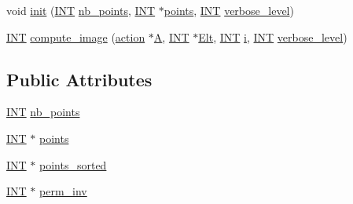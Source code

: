\begin{DoxyCompactItemize}
\item 
void \mbox{\hyperlink{classaction__by__restriction_af98e88c513afe51527082f11aac571f8}{init}} (\mbox{\hyperlink{galois_8h_a09fddde158a3a20bd2dcadb609de11dc}{I\+NT}} \mbox{\hyperlink{classaction__by__restriction_a2ac8535c2e40b78a69a6aad54deced42}{nb\+\_\+points}}, \mbox{\hyperlink{galois_8h_a09fddde158a3a20bd2dcadb609de11dc}{I\+NT}} $\ast$\mbox{\hyperlink{classaction__by__restriction_a8cfd948da85957a869756e2d0555ea7c}{points}}, \mbox{\hyperlink{galois_8h_a09fddde158a3a20bd2dcadb609de11dc}{I\+NT}} \mbox{\hyperlink{simeon_8_c_a818073fbcc2f439e7c56952f67386122}{verbose\+\_\+level}})
\item 
\mbox{\hyperlink{galois_8h_a09fddde158a3a20bd2dcadb609de11dc}{I\+NT}} \mbox{\hyperlink{classaction__by__restriction_a2d669c0f0b3905fb5effc983c9fbb0cc}{compute\+\_\+image}} (\mbox{\hyperlink{classaction}{action}} $\ast$\mbox{\hyperlink{simeon_8_c_a97833f04c3a9c008df5521a2fc291bb4}{A}}, \mbox{\hyperlink{galois_8h_a09fddde158a3a20bd2dcadb609de11dc}{I\+NT}} $\ast$\mbox{\hyperlink{simeon_8_c_aec1406935bdb1fee3561fcb840964100}{Elt}}, \mbox{\hyperlink{galois_8h_a09fddde158a3a20bd2dcadb609de11dc}{I\+NT}} \mbox{\hyperlink{alphabet2_8_c_acb559820d9ca11295b4500f179ef6392}{i}}, \mbox{\hyperlink{galois_8h_a09fddde158a3a20bd2dcadb609de11dc}{I\+NT}} \mbox{\hyperlink{simeon_8_c_a818073fbcc2f439e7c56952f67386122}{verbose\+\_\+level}})
\end{DoxyCompactItemize}
\subsection*{Public Attributes}
\begin{DoxyCompactItemize}
\item 
\mbox{\hyperlink{galois_8h_a09fddde158a3a20bd2dcadb609de11dc}{I\+NT}} \mbox{\hyperlink{classaction__by__restriction_a2ac8535c2e40b78a69a6aad54deced42}{nb\+\_\+points}}
\item 
\mbox{\hyperlink{galois_8h_a09fddde158a3a20bd2dcadb609de11dc}{I\+NT}} $\ast$ \mbox{\hyperlink{classaction__by__restriction_a8cfd948da85957a869756e2d0555ea7c}{points}}
\item 
\mbox{\hyperlink{galois_8h_a09fddde158a3a20bd2dcadb609de11dc}{I\+NT}} $\ast$ \mbox{\hyperlink{classaction__by__restriction_a34ba063e1c2ced2be42665dca3202c41}{points\+\_\+sorted}}
\item 
\mbox{\hyperlink{galois_8h_a09fddde158a3a20bd2dcadb609de11dc}{I\+NT}} $\ast$ \mbox{\hyperlink{classaction__by__restriction_ad004f2e5879f674753c16089ed3dac28}{perm\+\_\+inv}}
\end{DoxyCompactItemize}

